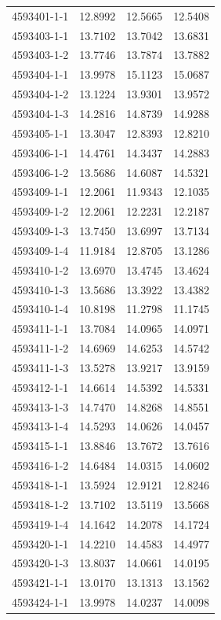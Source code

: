 \begin{longtable}{lrrr}
4593401-1-1 & 12.8992 & 12.5665 & 12.5408 \\
4593403-1-1 & 13.7102 & 13.7042 & 13.6831 \\
4593403-1-2 & 13.7746 & 13.7874 & 13.7882 \\
4593404-1-1 & 13.9978 & 15.1123 & 15.0687 \\
4593404-1-2 & 13.1224 & 13.9301 & 13.9572 \\
4593404-1-3 & 14.2816 & 14.8739 & 14.9288 \\
4593405-1-1 & 13.3047 & 12.8393 & 12.8210 \\
4593406-1-1 & 14.4761 & 14.3437 & 14.2883 \\
4593406-1-2 & 13.5686 & 14.6087 & 14.5321 \\
4593409-1-1 & 12.2061 & 11.9343 & 12.1035 \\
4593409-1-2 & 12.2061 & 12.2231 & 12.2187 \\
4593409-1-3 & 13.7450 & 13.6997 & 13.7134 \\
4593409-1-4 & 11.9184 & 12.8705 & 13.1286 \\
4593410-1-2 & 13.6970 & 13.4745 & 13.4624 \\
4593410-1-3 & 13.5686 & 13.3922 & 13.4382 \\
4593410-1-4 & 10.8198 & 11.2798 & 11.1745 \\
4593411-1-1 & 13.7084 & 14.0965 & 14.0971 \\
4593411-1-2 & 14.6969 & 14.6253 & 14.5742 \\
4593411-1-3 & 13.5278 & 13.9217 & 13.9159 \\
4593412-1-1 & 14.6614 & 14.5392 & 14.5331 \\
4593413-1-3 & 14.7470 & 14.8268 & 14.8551 \\
4593413-1-4 & 14.5293 & 14.0626 & 14.0457 \\
4593415-1-1 & 13.8846 & 13.7672 & 13.7616 \\
4593416-1-2 & 14.6484 & 14.0315 & 14.0602 \\
4593418-1-1 & 13.5924 & 12.9121 & 12.8246 \\
4593418-1-2 & 13.7102 & 13.5119 & 13.5668 \\
4593419-1-4 & 14.1642 & 14.2078 & 14.1724 \\
4593420-1-1 & 14.2210 & 14.4583 & 14.4977 \\
4593420-1-3 & 13.8037 & 14.0661 & 14.0195 \\
4593421-1-1 & 13.0170 & 13.1313 & 13.1562 \\
4593424-1-1 & 13.9978 & 14.0237 & 14.0098 \\

\end{longtable}
